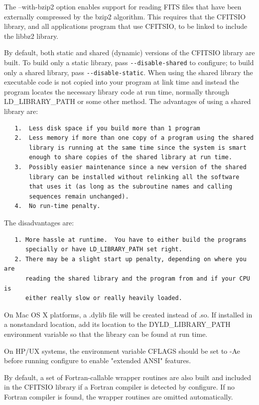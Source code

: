 \documentclass[11pt]{book}
\begin{document}
The --with-bzip2 option enables support for reading FITS files that have been
externally compressed by the bzip2 algorithm.  This requires that the CFITSIO
library, and all applications program that use CFITSIO, to be linked to include
the libbz2 library.

By default, both static and shared (dynamic) versions of the
CFITSIO library are built.  To build only a static library, pass
\verb+--disable-shared+ to configure; to build only a shared library,
pass \verb+--disable-static+.  When using the shared library the
executable code is not copied into your program at link time and
instead the program locates the necessary library code at run time,
normally through LD\_LIBRARY\_PATH or some other method.  The
advantages of using a shared library are:

\begin{verbatim}
   1.  Less disk space if you build more than 1 program
   2.  Less memory if more than one copy of a program using the shared
       library is running at the same time since the system is smart
       enough to share copies of the shared library at run time.
   3.  Possibly easier maintenance since a new version of the shared
       library can be installed without relinking all the software
       that uses it (as long as the subroutine names and calling
       sequences remain unchanged).
   4.  No run-time penalty.
\end{verbatim}
The disadvantages are:

\begin{verbatim}
   1. More hassle at runtime.  You have to either build the programs
      specially or have LD_LIBRARY_PATH set right.
   2. There may be a slight start up penalty, depending on where you are
      reading the shared library and the program from and if your CPU is
      either really slow or really heavily loaded.
\end{verbatim}

On Mac OS X platforms, a .dylib file will be created instead of .so.
If installed in a nonstandard location, add its location to the
DYLD\_LIBRARY\_PATH environment variable so that the library can be
found at run time.

On HP/UX systems, the environment variable CFLAGS should be set
to -Ae before running configure to enable "extended ANSI" features.

By default, a set of Fortran-callable wrapper routines are
also built and included in the CFITSIO library if a Fortran
compiler is detected by configure.  If no Fortran compiler is
found, the wrapper routines are omitted automatically.
\end{document}
